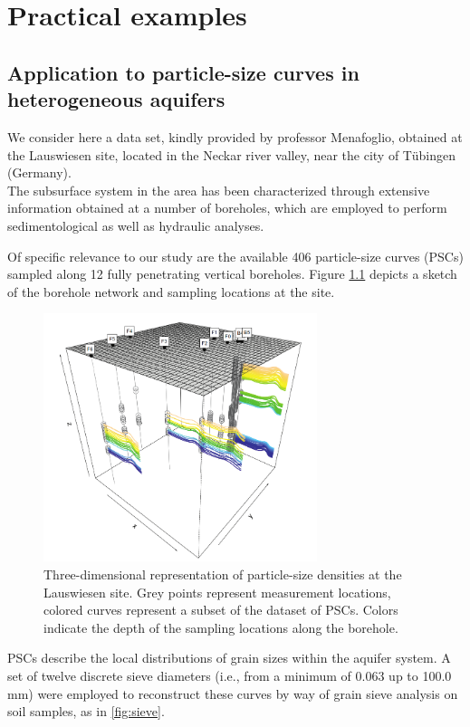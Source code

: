 \chapter{Practical examples}
\label{chapter3}


\noindent 
\section{Application to particle-size curves in heterogeneous aquifers}
We consider here a data set, kindly provided by professor Menafoglio, obtained at the Lauswiesen site, located in the Neckar river valley, near the city of T\"{u}bingen (Germany). \\ 
The subsurface system in the area has been characterized through extensive information obtained at a number of boreholes, which are employed to perform sedimentological as well as hydraulic analyses.

Of specific relevance to our study are the available 406 particle-size curves (PSCs) sampled along 12 fully penetrating vertical boreholes.
Figure \ref{fig:boreholes} depicts a sketch of the borehole network and sampling locations at the site. 

\begin{figure}
	\includegraphics[width=8cm]{./pictures/psc/particle_size_densities.png}
	\centering
	\caption{Three-dimensional representation of particle-size densities at the Lauswiesen site. Grey points represent measurement locations, colored curves represent a subset of the dataset of PSCs. Colors indicate the depth of the sampling locations along the borehole.}
	\label{fig:boreholes}	
\end{figure}

PSCs describe the local distributions of grain sizes within the aquifer system.
A set of twelve discrete sieve diameters (i.e., from a minimum of 0.063 up to 100.0 mm) were employed to reconstruct these curves by way of grain sieve analysis on soil samples, as in \ref{fig:sieve}.

